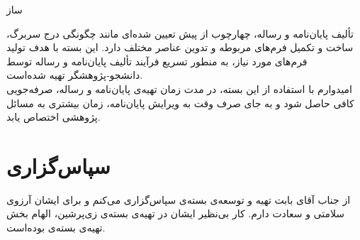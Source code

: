 \documentclass[%
12pt,%
twoside, %
openany, %
notitlepage,%
fleqn,%
]{article}
\numberwithin{equation}{section} %
\begin{document}
\pagestyle{plain}
‌ساز
\begin{center}
\begin{minipage}{0.67\textwidth}
تألیف پایان‌نامه و رساله، چهارچوب از پیش تعیین شده‌ای مانند چگونگی درج سربرگ، ساخت و تکمیل فرم‌های مربوطه و تدوین عناصر مختلف دارد\@. این بسته با هدف تولید فرم‌های مورد نیاز، به منطور تسریع فرآیند تألیف پایان‌نامه و رساله توسط دانشجو‑پژوهشگر تهیه شده‌است\@. \\
امیدوارم با استفاده از این بسته، در مدت زمان تهیه‌ی پایان‌نامه و رساله، صرفه‌جویی کافی حاصل شود و به جای صرف وقت به ویرایش پایان‌نامه، زمان بیشتری به مسائل پژوهشی اختصاص یابد\@.
\end{minipage}
\end{center}
\tableofcontents
\section*{سپاس‌گزاری}
از جناب آقای  بابت تهیه و توسعه‌ی بسته‌ی  سپاس‌گزاری می‌کنم و برای ایشان آرزوی سلامتی و سعادت دارم\@. کار بی‌نظیر ایشان در تهیه‌ی بسته‌ی زی‌پرشین، الهام بخش تهیه‌ی بسته‌ی  بوده‌است.
\end{document}
